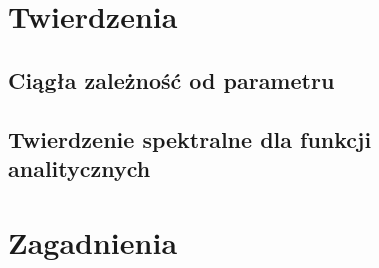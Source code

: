 


	
  \maketitle
  
  \tableofcontents
  
  \chapter{Twierdzenia}
    \section{Ciągła zależność od parametru}
      
    \section{Twierdzenie spektralne dla funkcji analitycznych}
      
  
  \chapter{Zagadnienia}
